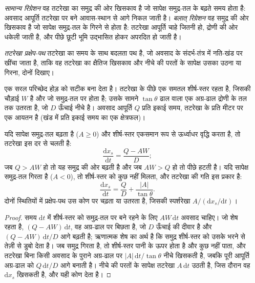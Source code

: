 \begin{definition}[सामान्य और बलात् रिग्रेशन]\label{def:b3:sequence-stratigraphy:regression}
\emph{सामान्य रिग्रेशन} वह तटरेखा का समुद्र की ओर खिसकाव है
जो सापेक्ष समुद्र-तल के बढ़ते समय होता है: अवसाद आपूर्ति तटरेखा पर बने आवास-स्थान से आगे निकल जाती है।
\emph{बलात् रिग्रेशन} वह समुद्र की ओर खिसकाव है जो सापेक्ष समुद्र-तल के गिरने से
होता है: तटरेखा आपूर्ति चाहे जितनी हो, द्रोणी की ओर धकेली जाती है,
और पीछे छूटी भूमि उद्भासित होकर
अपरदित हो जाती है।
\end{definition}

\begin{definition}[तटरेखा प्रक्षेप-पथ]\label{def:b3:sequence-stratigraphy:trajectory}
\emph{तटरेखा प्रक्षेप-पथ} तटरेखा का समय के साथ बदलता पथ है,
जो अवसाद के संदर्भ-तंत्र में नति-खंड पर खींचा जाता है,
ताकि वह तटरेखा का क्षैतिज खिसकाव और
नीचे की परतों के सापेक्ष उसका उठना या गिरना, दोनों दिखाए।
\end{definition}

एक सरल परिच्छेद होड़ को सटीक बना देता है। तटरेखा के पीछे एक समतल शीर्ष-स्तर रहता है,
जिसकी चौड़ाई $W$ है और जो समुद्र-तल पर होता है; उसके सामने $\tan\theta$ ढाल वाला
एक अग्र-ढाल द्रोणी के तल तक उतरता है, जो $D$ ऊँचाई नीचे है।
अवसाद आपूर्ति $Q$ प्रति इकाई समय, तटरेखा के प्रति मीटर पर एक आयतन है
(खंड में प्रति इकाई समय का एक क्षेत्रफल)।

\begin{proposition}[तटरेखा प्रक्षेप-पथ]\label{prop:b3:sequence-stratigraphy:trajectory}
यदि सापेक्ष समुद्र-तल बढ़ता है ($A \ge 0$) और शीर्ष-स्तर एकसमान रूप से ऊर्ध्वाधर वृद्धि करता है,
तो तटरेखा इस दर से चलती है:
\[
\frac{\mathrm dx_s}{\mathrm dt} = \frac{Q - AW}{D};
\]
जब $Q > AW$ हो तो यह समुद्र की ओर बढ़ती है और जब $AW > Q$ हो तो पीछे हटती है। यदि सापेक्ष समुद्र-तल
गिरता है ($A < 0$), तो शीर्ष-स्तर को कुछ नहीं मिलता, और तटरेखा की गति इस प्रकार है:
\[
\frac{\mathrm dx_s}{\mathrm dt} = \frac{Q}{D} + \frac{|A|}{\tan\theta}.
\]
दोनों स्थितियों में प्रक्षेप-पथ उस कोण पर चढ़ता या उतरता है, जिसकी स्पर्शरेखा
$A/(\mathrm dx_s/\mathrm dt)$।
\end{proposition}

\begin{proof}
समय $\mathrm dt$ में शीर्ष-स्तर को समुद्र-तल पर बने रहने के लिए $AW\,\mathrm dt$ अवसाद चाहिए।
जो शेष रहता है, $(Q - AW)\,\mathrm dt$, वह अग्र-ढाल पर बिछता है,
जो $D$ ऊँचाई की दीवार है और $(Q - AW)\,\mathrm dt/D$ आगे बढ़ती है;
ऋणात्मक शेष का अर्थ है कि समुद्र शीर्ष-स्तर को उसके भरने से तेज़ी से डुबो देता है।
जब समुद्र गिरता है, तो शीर्ष-स्तर पानी के ऊपर होता है और कुछ नहीं पाता, और तटरेखा
बिना किसी अवसाद के पुराने अग्र-ढाल पर $|A|\,\mathrm dt/\tan\theta$ नीचे खिसकती है,
जबकि पूरी आपूर्ति अग्र-ढाल को $Q\,\mathrm
dt/D$ आगे बनाती है। नीचे की परतों के सापेक्ष तटरेखा $A\,\mathrm dt$ उठती है,
जिस दौरान वह $\mathrm dx_s$ खिसकती है, और यही कोण देता है।
\end{proof}


